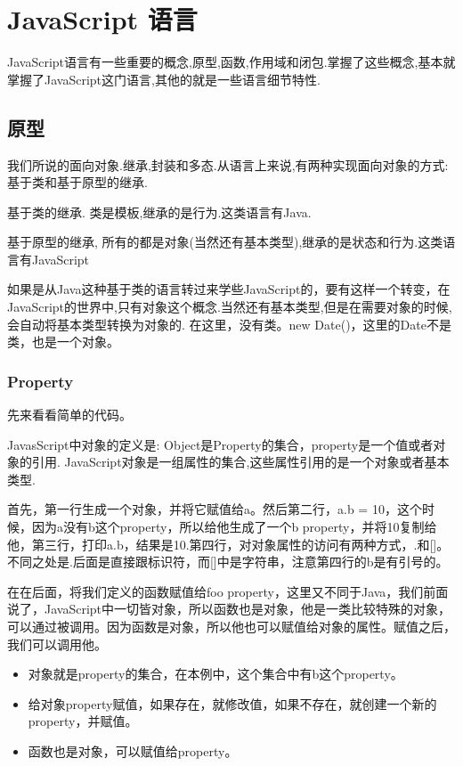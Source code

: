 \chapter{JavaScript 语言}
	JavaScript语言有一些重要的概念,原型,函数,作用域和闭包.掌握了这些概念,基本就掌握了JavaScript这门语言,其他的就是一些语言细节特性.
	\section{原型}
	我们所说的面向对象.继承,封装和多态.从语言上来说,有两种实现面向对象的方式:基于类和基于原型的继承.

	基于类的继承. 类是模板,继承的是行为.这类语言有Java.
	
	基于原型的继承, 所有的都是对象(当然还有基本类型),继承的是状态和行为.这类语言有JavaScript

	如果是从Java这种基于类的语言转过来学些JavaScript的，要有这样一个转变，在JavaScript的世界中,只有对象这个概念.当然还有基本类型,但是在需要对象的时候,会自动将基本类型转换为对象的. 在这里，没有类。new Date()，这里的Date不是类，也是一个对象。
	
	
	\subsection{Property}

	先来看看简单的代码。
	
	

	JavasScript中对象的定义是: Object是Property的集合，property是一个值或者对象的引用. JavaScript对象是一组属性的集合,这些属性引用的是一个对象或者基本类型.
	
	首先，第一行生成一个对象，并将它赋值给a。然后第二行，a.b = 10，这个时候，因为a没有b这个property，所以给他生成了一个b property，并将10复制给他，第三行，打印a.b，结果是10.第四行，对对象属性的访问有两种方式，.和[]。不同之处是.后面是直接跟标识符，而[]中是字符串，注意第四行的b是有引号的。
	
	在在后面，将我们定义的函数赋值给foo property，这里又不同于Java，我们前面说了，JavaScript中一切皆对象，所以函数也是对象，他是一类比较特殊的对象，可以通过被调用。因为函数是对象，所以他也可以赋值给对象的属性。赋值之后，我们可以调用他。
	\begin{itemize}
	\item 对象就是property的集合，在本例中，这个集合中有b这个property。
	\item 给对象property赋值，如果存在，就修改值，如果不存在，就创建一个新的property，并赋值。
	\item 函数也是对象，可以赋值给property。
	\end{itemize}
	
